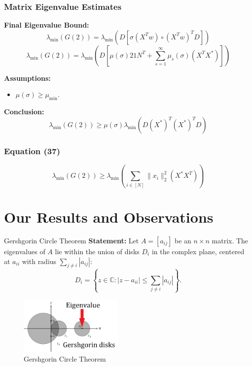 \documentclass[serif, aspectratio=169]{beamer}
\begin{document}
\begin{frame}
\frametitle{Matrix Eigenvalue Estimates}

\textbf{Final Eigenvalue Bound:}
\[
\lambda_{\min}( G(2) ) = \lambda_{\min}( D \left[ \sigma(X^T w) \circ ( X^T w )^T D \right] )
\]
\[
\lambda_{\min}( G(2) ) = \lambda_{\min}( D \left[ \mu(\sigma) 21N^T + \sum_{s=1}^{\infty} \mu_s(\sigma) (X^T X^*) \right] )
\]

\textbf{Assumptions:}
\begin{itemize}
	\item \( \mu(\sigma) \geq \mu_{\text{min}} \).
\end{itemize}

\vspace{0.5cm}

\textbf{Conclusion:}
\[
\lambda_{\min}( G(2) ) \geq \mu(\sigma) \lambda_{\min}( D(X^*)^T (X^*)^T D )
\]

\end{frame}

\begin{frame}
\frametitle{Equation (37)}

\[
\lambda_{\min} \left( G(2) \right) \geq \lambda_{\min} \left( \sum_{i \in [N]} \| x_i \|^2_2 (X^* X^T) \right)
\]

\end{frame}




\section{Our Results and Observations}


\begin{frame}{Gershgorin Circle Theorem}
	\textbf{Statement:} Let \( A = [a_{ij}] \) be an \( n \times n \) matrix. The eigenvalues of \( A \) lie within the union of disks \( D_i \) in the complex plane, centered at \( a_{ii} \) with radius \( \sum_{j \neq i} |a_{ij}| \):
	\[
	D_i = \left\{ z \in \mathbb{C} : |z - a_{ii}| \leq \sum_{j \neq i} |a_{ij}| \right\}.
	\]


    \begin{figure}
		\centering
		\includegraphics[width=0.45\textwidth]{pic/gresh.jpg}
		\caption{Gershgorin Circle Theorem}
	\end{figure}
\end{frame}
\end{document}
